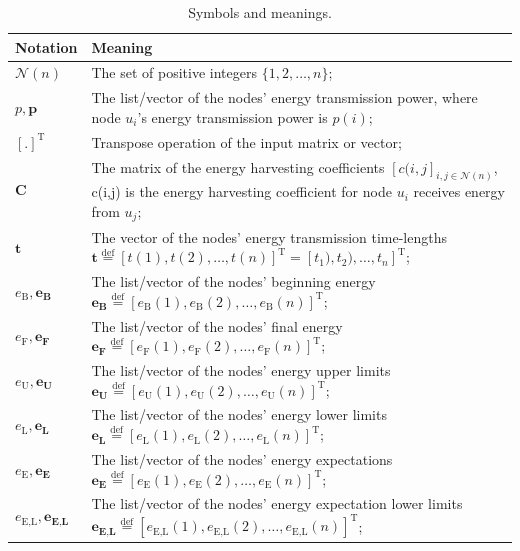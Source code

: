 \documentclass[journal,10pt]{IEEEtran}
\begin{document}
\begin{table}[!htbp]
\caption{Symbols and meanings.}
\centering
\label{T1}
\footnotesize{
\begin{tabular}
{|p{}|p{}|}
\hline
\hline
\textbf{Notation} & Meaning\\
\hline
\hline
$\mathcal{N}(n)$ & The set of positive integers $\{1,2,\ldots,n\}$;\\
\hline
$p, \mathbf{p}$ & The list/vector of the nodes' energy transmission power, where node $u_i$'s energy transmission power is $p(i)$;\\
\hline
$[.]^{\text{T}}$ & Transpose operation of the input matrix or vector;\\
\hline
$\mathbf{C}$ & The matrix of the energy harvesting coefficients $[c(i,j]_{i,j{\in}\mathcal{N}(n)}$, c(i,j) is the energy harvesting coefficient for node $u_i$ receives energy from $u_j$;\\
\hline
$\mathbf{t}$ & The vector of the nodes' energy transmission time-lengths $\mathbf{t}{\mathop{=}\limits^\text{def}}[t(1),t(2),\ldots,t(n)]^{\text{T}}{=}[t_1),t_2),\ldots,t_n]^{\text{T}}$;\\
\hline
$e_\text{B}, \mathbf{e_\text{B}}$ & The list/vector of the nodes' beginning energy $\mathbf{e_\text{B}}{\mathop{=}\limits^\text{def}}[e_\text{B}(1),e_\text{B}(2),\ldots,e_\text{B}(n)]^{\text{T}}$;\\
\hline
$e_\text{F}, \mathbf{e_\text{F}}$ & The list/vector of the nodes' final energy $\mathbf{e_\text{F}}{\mathop{=}\limits^\text{def}}[e_\text{F}(1),e_\text{F}(2),\ldots,e_\text{F}(n)]^{\text{T}}$;\\
\hline
$e_\text{U}, \mathbf{e_\text{U}}$ & The list/vector of the nodes' energy upper limits $\mathbf{e_\text{U}}{\mathop{=}\limits^\text{def}}[e_\text{U}(1),e_\text{U}(2),\ldots,e_\text{U}(n)]^{\text{T}}$;\\
\hline
$e_\text{L}, \mathbf{e_\text{L}}$ & The list/vector of the nodes' energy lower limits $\mathbf{e_\text{L}}{\mathop{=}\limits^\text{def}}[e_\text{L}(1),e_\text{L}(2),\ldots,e_\text{L}(n)]^{\text{T}}$;\\
\hline
$e_\text{E}, \mathbf{e_\text{E}}$ & The list/vector of the nodes' energy expectations $\mathbf{e_\text{E}}{\mathop{=}\limits^\text{def}}[e_\text{E}(1),e_\text{E}(2),\ldots,e_\text{E}(n)]^{\text{T}}$;\\
\hline
$e_\text{E,L}, \mathbf{e_\text{E,L}}$ & The list/vector of the nodes' energy expectation lower limits $\mathbf{e_\text{E,L}}{\mathop{=}\limits^\text{def}}[e_\text{E,L}(1),e_\text{E,L}(2),\ldots,e_\text{E,L}(n)]^{\text{T}}$;\\

\end{tabular}}
\end{table}
\end{document}

